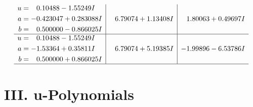 \documentclass[1p]{elsarticle_modified}
\theoremstyle{definition}
\begin{document}
$$\begin{array}{c|c|c}
\begin{aligned}
u &= \phantom{-}0.10488 - 1.55249 I \\
a &= -0.423047 + 0.283088 I \\
b &= \phantom{-}0.500000 - 0.866025 I\end{aligned}
 & \phantom{-}6.79074 + 1.13408 I & \phantom{-}1.80063 + 0.49697 I \\ \hline\begin{aligned}
u &= \phantom{-}0.10488 - 1.55249 I \\
a &= -1.53364 + 0.35811 I \\
b &= \phantom{-}0.500000 + 0.866025 I\end{aligned}
 & \phantom{-}6.79074 + 5.19385 I & -1.99896 - 6.53786 I\\
 \hline 
 \end{array}$$\newpage
\newpage\renewcommand{\arraystretch}{1}
\centering \section*{ III. u-Polynomials}
\end{document}
